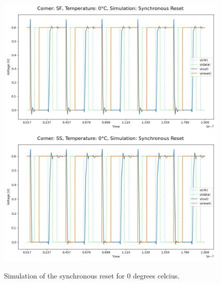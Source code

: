 \begin{figure}[H]
    \vspace{5pt}
    \includegraphics[height= 0.21\textheight]{figures/aimspice/SF/0/W4.csv.png}
    \vspace{5pt}
    \includegraphics[height= 0.21\textheight]{figures/aimspice/SS/0/W4.csv.png}
    \caption{Simulation of the synchronous reset for 0 degrees celcius.}
    \label{fig:aimspice_W4_0}
\end{figure}

\pagebreak

